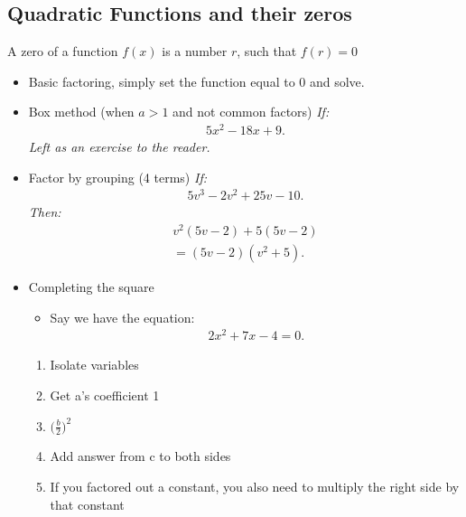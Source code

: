 \documentclass{report}
\begin{document}
  \subsection{Quadratic Functions and their zeros}
  A zero of a function $f(x)$ is a number $r$, such that $f(r) = 0$
    \begin{itemize}
        \item Basic factoring, simply set the function equal to 0 and solve.
        \item Box method (when $a>1$ and not common factors)
            \bigbreak \noindent 
            \textit{If:}
            \begin{align*}
                5x^{2}-18x+9
            .\end{align*}
            \bigbreak \noindent 
            \textit{Left as an exercise to the reader.}
        \item Factor by grouping (4 terms)
            \bigbreak \noindent 
            \textit{If:}
            \begin{align*}
                5v^{3}-2v^{2}+25v-10
            .\end{align*}
            \bigbreak \noindent 
            \textit{Then:}
            \begin{align*}
                v^{2}(5v-2)+5(5v-2) \\
                = (5v-2)(v^{2}+5)
            .\end{align*}
        \item Completing the square
          \begin{itemize}
            \item Say we have the equation:
              \begin{align*}
                2x^{2} + 7x - 4 = 0
              .\end{align*}
          \end{itemize}
          \begin{enumerate}[label=\alph*.)]
            \item Isolate variables 
            \item Get a's coefficient 1
            \item $\bigg(\frac{b}{2}\bigg)^{2} $
            \item Add answer from c to both sides
            \item If you factored out a constant, you also need to multiply the right side by that constant
          \end{enumerate}
          \begin{align*}

\end{align*}
\end{itemize}
\end{document}
